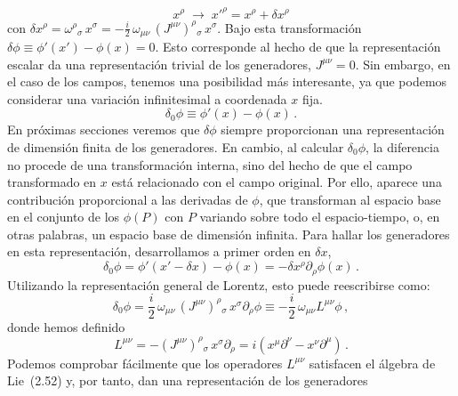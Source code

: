 \documentclass[a4paper,11pt]{book} %
\begin{document}
\begin{equation}
x^{\rho}\;\rightarrow\;x'^{\rho}=x^{\rho}+\delta x^{\rho}
\end{equation}
\noindent
con 
$\delta x^{\rho}=\omega^{\rho}{}_{\sigma}\,x^{\sigma}
=-\frac{i}{2}\,\omega_{\mu\nu}\,(J^{\mu\nu})^{\rho}{}_{\sigma}\,x^{\sigma}$.
\medskip\newline
Bajo
esta transformación $\delta\phi\equiv\phi'(x')-\phi(x)=0$. Esto
corresponde al hecho de que la representación escalar da una representación
trivial de los generadores, $J^{\mu\nu}=0$. 
\medskip\newline
Sin embargo, en el caso de los
campos, tenemos una posibilidad más interesante, ya que podemos considerar una
variación infinitesimal a coordenada $x$ fija.
\begin{equation}
\delta_{0}\phi\equiv\phi'(x)-\phi(x)\,.
\end{equation}
 \noindent
En próximas secciones
veremos que $\delta\phi$  siempre proporcionan una
representación de dimensión finita de los generadores. En cambio, al calcular $\delta_0\phi$, la diferencia no procede de una transformación interna, sino del hecho de que el campo transformado en $x$ está relacionado con el campo original. Por ello, aparece una contribución proporcional a las derivadas de $\phi$, que transforman al espacio base en el conjunto de los $\phi(P)$ con $P$ variando sobre todo el
espacio-tiempo, o, en otras palabras, un espacio base de dimensión infinita. 
 \medskip\newline
Para hallar los generadores en esta representación, desarrollamos a primer orden en $\delta x$,
\begin{equation}
\delta_{0}\phi=\phi'(x'-\delta x)-\phi(x)=-\delta x^{\rho}\partial_{\rho}\phi(x)\,.
\end{equation}
\noindent
Utilizando la representación general de Lorentz, esto puede reescribirse como:
\begin{equation}
\delta_{0}\phi=\frac{i}{2}\,\omega_{\mu\nu}\,(J^{\mu\nu})^{\rho}{}_{\sigma}\,
x^{\sigma}\partial_{\rho}\phi
\equiv-\frac{i}{2}\,\omega_{\mu\nu}L^{\mu\nu}\phi\,,
\end{equation}
 \noindent
donde hemos definido
\begin{equation}
L^{\mu\nu}=-(J^{\mu\nu})^{\rho}{}_{\sigma}\,x^{\sigma}\partial_{\rho}
=i(x^{\mu}\partial^{\nu}-x^{\nu}\partial^{\mu})\,.
\end{equation}
\noindent
Podemos comprobar fácilmente que los operadores $L^{\mu\nu}$ satisfacen el
álgebra de Lie~(2.52) y, por tanto, dan una representación de los generadores
\end{document}
